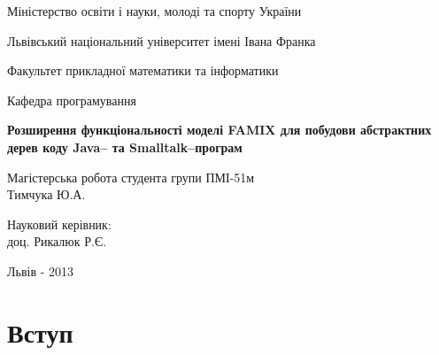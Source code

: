 \documentclass[12pt,a4paper]{article}
\begin{document}

\pagestyle{empty}
\setlength{\parindent}{1.5cm}
\fontsize{14pt}{6mm}\selectfont

\begin{center}
  Міністерство освіти і науки, молоді та спорту України
  
  Львівський національний університет імені Івана Франка

  Факультет прикладної математики та інформатики
\end{center}

\vspace{1cm}

\begin{flushright}
  Кафедра програмування
\end{flushright}

\vspace{4cm}

\begin{center}
  {\bfseries\Large Розширення функціональності моделі FAMIX для побудови абстрактних дерев коду Java-- та Smalltalk--програм}
\end{center}

\vspace{2cm}

\begin{small}
\begin{flushleft}
  Магістерська робота студента групи ПМІ-51м\\
  Тимчука Ю.А.\linebreak
  
  Науковий керівник:\\
  доц. Рикалюк Р.Є.
\end{flushleft}
\end{small}

\vspace{5cm}

\begin{center}
  Львів - 2013 
\end{center}

\clearpage



\fontsize{14pt}{6mm}\selectfont

\tableofcontents
\clearpage
\pagestyle{plain}
\section{Вступ}
\end{document}
